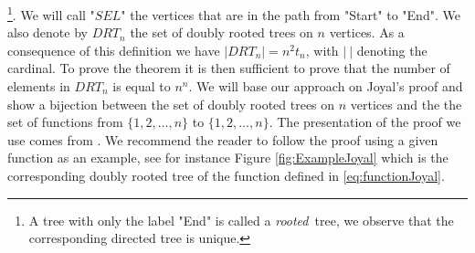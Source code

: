 \footnote{A tree with only the label "End" is called a \emph{rooted} tree, we observe that the corresponding directed tree is unique.}.
We will call "$SEL$" the vertices that are in the path from "Start" to "End". 
We also denote by $DRT_n$ the set of doubly rooted trees on $n$ vertices.
\newline
As a consequence of this definition we have $|DRT_n| = n^2 t_n$, with $|\ |$ denoting the cardinal. 
To prove the theorem it is then sufficient to prove that the number of elements in $DRT_n$ is equal to $n^n$.
We will base our approach on Joyal's proof \cite{joyal} and show a bijection between the set of doubly rooted trees on $n$ vertices and the the set of functions from $\{1, 2, \ldots, n\}$ to $\{1, 2, \ldots, n\}$.
The presentation of the proof we use comes from \cite{JoyalProof}.
We recommend the reader to follow the proof using a given function as an example, see for instance Figure \ref{fig:ExampleJoyal} which is the corresponding doubly rooted tree of the function defined in \eqref{eq:functionJoyal}.
